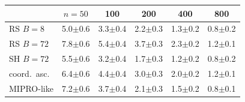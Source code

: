 \begin{tabular}{lccccc}
\toprule
 & $n{=}50$ & 100 & 200 & 400 & 800 \\
\midrule
RS $B{=}8$ & 5.0$\pm$0.6 & 3.3$\pm$0.4 & 2.2$\pm$0.3 & 1.3$\pm$0.2 & 0.8$\pm$0.2 \\
RS $B{=}72$ & 7.8$\pm$0.6 & 5.4$\pm$0.4 & 3.7$\pm$0.3 & 2.3$\pm$0.2 & 1.2$\pm$0.1 \\
SH $B{=}72$ & 5.5$\pm$0.6 & 3.2$\pm$0.4 & 1.7$\pm$0.3 & 1.2$\pm$0.2 & 0.8$\pm$0.2 \\
coord.\ asc. & 6.4$\pm$0.6 & 4.4$\pm$0.4 & 3.0$\pm$0.3 & 2.0$\pm$0.2 & 1.2$\pm$0.1 \\
MIPRO-like & 7.2$\pm$0.6 & 3.7$\pm$0.4 & 2.1$\pm$0.3 & 1.5$\pm$0.2 & 0.8$\pm$0.1 \\
\bottomrule
\end{tabular}
